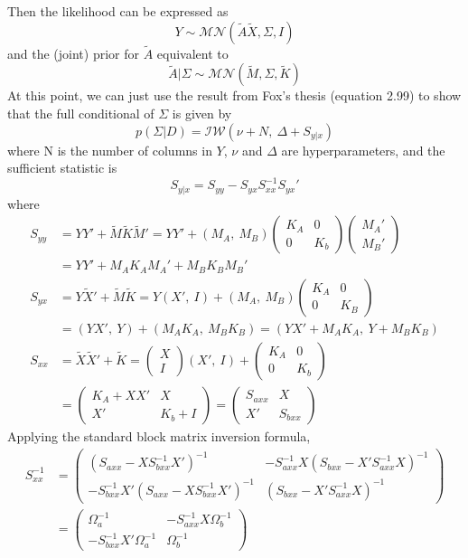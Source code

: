 \documentclass[12pt]{article}
\begin{document}
Then the likelihood can be expressed as
\[Y\sim\mathcal{MN}(\tilde{A}\tilde{X},\Sigma,I)\]
and the (joint) prior for $\tilde{A}$ equivalent to
\[\tilde{A}|\Sigma\sim\mathcal{MN}(\tilde{M},\Sigma,\tilde{K})\]
At this point, we can just use the result from Fox's thesis (equation 2.99) to show that the full conditional of $\Sigma$ is given by
\[p(\Sigma|D)=\mathcal{IW}(\nu+N,~\Delta+S_{y|x})\]
where N is the number of columns in $Y$, $\nu$ and $\Delta$ are hyperparameters, and the sufficient statistic is
\[S_{y|x}=S_{yy}-S_{yx}S^{-1}_{xx}S_{yx}'\]
where
\begin{align*}
S_{yy} &= YY'+\tilde{M}\tilde{K}\tilde{M}' = YY'+(M_A,~M_B)\begin{pmatrix}K_A & 0 \\ 0 & K_b\end{pmatrix}\begin{pmatrix}M_A'\\M_B'\end{pmatrix}\\
&= YY'+M_A K_A M_A' + M_B K_B M_B'\\
S_{yx} &= Y\tilde{X}'+\tilde{M}\tilde{K} = Y(X',~I)+(M_A,~M_B)\begin{pmatrix}K_A & 0 \\ 0 & K_B\end{pmatrix}\\
&= (YX',~Y) + (M_A K_A,~ M_B K_B) = (YX'+M_AK_A,~Y+M_BK_B)\\
S_{xx} &= \tilde{X}\tilde{X}'+\tilde{K} = \begin{pmatrix}X\\I\end{pmatrix}(X',~I) + \begin{pmatrix}K_A & 0 \\ 0 & K_b\end{pmatrix}\\
&=\begin{pmatrix}K_A+XX' & X \\ X' & K_b+I\end{pmatrix} = \begin{pmatrix}S_{axx} & X \\ X' & S_{bxx}\end{pmatrix}
\end{align*}
Applying the standard block matrix inversion formula,
\begin{align*}
S_{xx}^{-1} &= \begin{pmatrix}\left(S_{axx}-X S_{bxx}^{-1}X'\right)^{-1} & -S_{axx}^{-1}X\left(S_{bxx}-X'S_{axx}^{-1}X\right)^{-1} \\ -S_{bxx}^{-1}X'\left(S_{axx}-XS_{bxx}^{-1}X'\right)^{-1} & \left(S_{bxx}-X'S_{axx}^{-1}X\right)^{-1}\end{pmatrix}\\
&= \begin{pmatrix}\Omega_a^{-1} & -S_{axx}^{-1}X\Omega_b^{-1}\\
                -S_{bxx}^{-1}X'\Omega_a^{-1} & \Omega_b^{-1}\end{pmatrix}
\end{align*}
\end{document}
